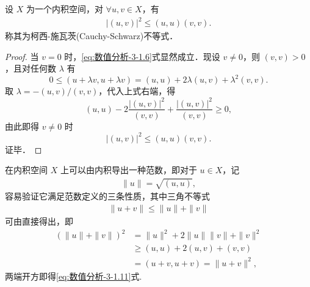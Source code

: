 \documentclass[../../main.tex]{subfiles}
\begin{document}
\begin{theorem}\label{theorem:数值分析-3-定理-2}
设 \( X \) 为一个内积空间，对 \( \forall u, v \in X \)，有
\begin{align}
|(u, v)|^2 \leqslant (u, u)(v, v).\label{eq:数值分析-3-1.6}
\end{align}
称其为柯西-施瓦茨(Cauchy-Schwarz)不等式．
\end{theorem}
\begin{proof}
当 \( v = 0 \) 时，\eqref{eq:数值分析-3-1.6}式显然成立．现设 \( v \neq 0 \)，则 \( (v, v) > 0 \)，且对任何数 \( \lambda \) 有
\[
0 \leqslant (u + \lambda v, u + \lambda v) = (u, u) + 2\lambda (u, v) + \lambda^2 (v, v).
\]
取 \( \lambda = -(u, v)/(v, v) \)，代入上式右端，得
\[
(u, u) - 2\frac{|(u, v)|^2}{(v, v)} + \frac{|(u, v)|^2}{(v, v)} \geqslant 0,
\]
由此即得 \( v \neq 0 \) 时
\[
|(u, v)|^2 \leqslant (u, u)(v, v).
\]
证毕．
\end{proof}
\begin{remark}
在内积空间 \( X \) 上可以由内积导出一种范数，即对于 \( u \in X \)，记
\begin{align}
\| u \| = \sqrt{(u, u)}, \label{eq:数值分析-3-1.10}
\end{align}
容易验证它满足范数定义的三条性质，其中三角不等式
\begin{align}
\| u + v \| \leqslant \| u \| + \| v \| \label{eq:数值分析-3-1.11}
\end{align}
可由直接得出，即
\begin{align*}
(\parallel u\parallel +\parallel v\parallel )^2&=\parallel u\parallel ^2+2\parallel u\parallel \parallel v\parallel +\parallel v\parallel ^2
\\
&\geqslant (u,u)+2(u,v)+(v,v)
\\
&=(u+v,u+v)=\parallel u+v\parallel ^2,
\end{align*}
两端开方即得\eqref{eq:数值分析-3-1.11}式.
\end{remark}
\end{document}
